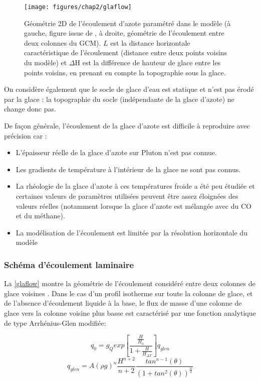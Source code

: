 \begin{figure}[!h]
\begin{center} 
	\texttt{[image: figures/chap2/glaflow]}
\end{center} 
\caption{Géométrie 2D de l’écoulement d’azote paramétré dans le modèle (à gauche, figure issue de \citet{Umur:17}, à droite, géométrie de l'écoulement entre deux colonnes du GCM). $L$ est la distance horizontale caractéristique de l’écoulement (distance entre deux points voisins du modèle) et $\Delta$H est la différence de hauteur de glace entre les points voisins, en prenant en compte la topographie sous la glace.} 
\label{glaflow}
\end{figure}

On considère également que le socle de glace d’eau est statique et n’est pas érodé par la glace : la topographie du socle (indépendante de la glace d’azote) ne change donc pas.  

De façon générale, l’écoulement de la glace d’azote est difficile à reproduire avec précision car :

\begin{itemize}
\item L’épaisseur réelle de la glace d’azote sur Pluton n’est pas connue.
\item Les gradients de température à l’intérieur de la glace ne sont pas connus.
\item La rhéologie de la glace d’azote à ces températures froide a été peu étudiée et certaines valeurs de paramètres utilisées peuvent être assez éloignées des valeurs réelles (notamment lorsque la glace d’azote est mélangée avec du CO et du méthane).
\item La modélisation de l’écoulement est limitée par la résolution horizontale du modèle
\end{itemize}

\subsubsection{Schéma d’écoulement laminaire}

La \autoref{glaflow} montre la géométrie de l’écoulement considéré entre deux colonnes de glace voisines \citep{Umur:17}. 
Dans le cas d’un profil isotherme sur toute la colonne de glace, et de l'absence d’écoulement liquide à la base, le flux de masse d’une colonne de glace vers la colonne voisine plus basse est caractérisé par une fonction analytique de type Arrhénius-Glen modifiée:

\begin{equation}
q_{0}=g_Q exp[\frac{\frac{H}{H_a}}{1+\frac{H}{H_{\Delta T}}} ] q_{glen} 
\end{equation}
\begin{equation}
q_{glen}=A(\rho g)^{n}\frac{H^{n+2}}{n+2}\frac{tan^{n-1}(\theta) } { (1+tan^{2}(\theta) ) ^{\frac{n}{2}}}
\end{equation}

